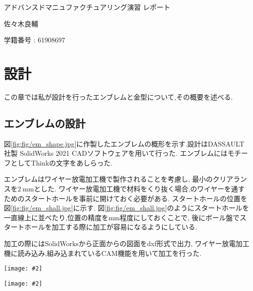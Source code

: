 \documentclass[uplatex,a4j,11pt,dvipdfmx]{jsreport}
\makeatletter
\def\fgcaption{\def\@captype{figure}\caption}
\newcommand{\mfig}[3][width=15cm]{
\begin{center}
\texttt{[image: \#2]}
\fgcaption{#3 \label{fig:#2}}
\end{center}
}
\makeatother
\begin{document}
  \begin{titlepage}
    \begin{center}
      \vspace*{150truept}
      
      {\huge アドバンスドマニュファクチュアリング演習 レポート} 
      
      \vspace{80truept}
      
      {\LARGE 佐々木良輔}
      
      \vspace{5truept}
      
      {\Large 学籍番号 : 61908697}
      
    \end{center}
  \end{titlepage}
  {
    \makeatletter
    \renewcommand{\@makeschapterhead}[1]{
      \textsf{\HUGE 目次}\par
      \vtop to 2\baselineskip{
      }\par}
    \makeatother
    \tableofcontents
  }
  \setcounter{page}{0}
  \chapter{設計}
  この章では私が設計を行ったエンブレムと金型について,その概要を述べる.
  \section{エンブレムの設計}
  図\ref{fig:fig/em_shape.jpg}に作製したエンブレムの概形を示す.設計はDASSAULT社製 SolidWorks 2021 CADソフトウェアを用いて行った.
  エンブレムにはモチーフとしてThinkの文字をあしらった.
  
  エンブレムはワイヤー放電加工機で製作されることを考慮し,
  最小のクリアランスを$2\ \si{\milli\metre}$とした.
  ワイヤー放電加工機で材料をくり抜く場合,のワイヤーを通すためのスタートホールを事前に開けておく必要がある.
  スタートホールの位置を図\ref{fig:fig/em_shall.jpg}に示す.
  図\ref{fig:fig/em_shall.jpg}のようにスタートホールを一直線上に並べたり,位置の精度を$\si{\milli\metre}$程度にしておくことで,
  後にボール盤でスタートホールを加工する際に加工が容易になるようにしている.

  加工の際にはSolidWorksから正面からの図面をdxf形式で出力,
  ワイヤー放電加工機に読み込み,組み込まれているCAM機能を用いて加工を行った.
  \mfig[width=8cm]{fig/em_shape.jpg}{エンブレムの概形}
  \mfig[width=12cm]{fig/em_shall.jpg}{スタートホールの位置}
\end{document}
